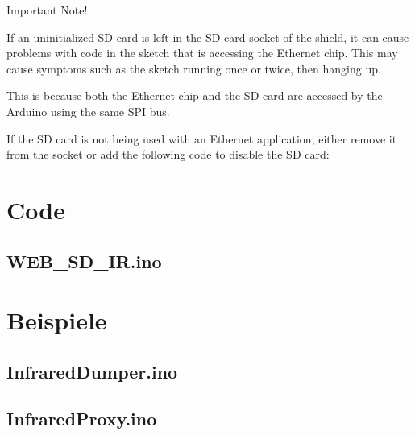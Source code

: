 \documentclass[10pt]{article}
\newcommand{\mylisting}[2][]{%
}
\begin{document}
Important Note!

If an uninitialized SD card is left in the SD card socket of the shield, it can cause problems with code in the sketch that is accessing the Ethernet chip. This may cause symptoms such as the sketch running once or twice, then hanging up.

This is because both the Ethernet chip and the SD card are accessed by the Arduino using the same SPI bus.

If the SD card is not being used with an Ethernet application, either remove it from the socket or add the following code to disable the SD card:

\section{Code}
\subsection{WEB\_SD\_IR.ino}
	\mylisting[language=C]{../code/WEB_SD_IR/WEB_SD_IR.ino}
\newpage
\section{Beispiele}
\subsection{InfraredDumper.ino}
	\mylisting[language=C]{../example/InfraredDumper/InfraredDumper.ino}
\newpage
\subsection{InfraredProxy.ino}
	\mylisting[language=C]{../example/InfraredProxy/InfraredProxy.ino}
	
\end{document}
